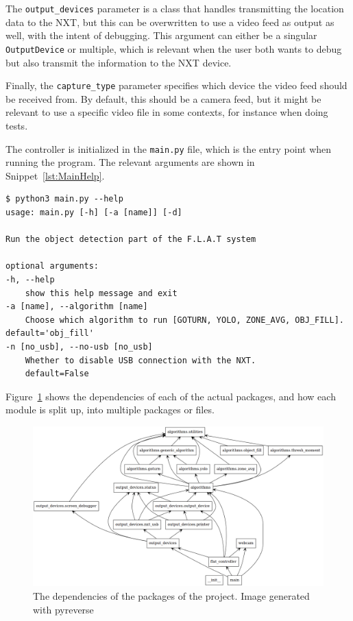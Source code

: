 The \texttt{output\_devices} parameter is a class that handles transmitting the location data to the NXT, but this can be overwritten to use a video feed as output as well, with the intent of debugging. 
This argument can either be a singular \texttt{OutputDevice} or multiple, which is relevant when the user both wants to debug but also transmit the information to the NXT device.


Finally, the \texttt{capture\_type} parameter specifies which device the video feed should be received from.
By default, this should be a camera feed, but it might be relevant to use a specific video file in some contexts, for instance when doing tests.


The controller is initialized in the \texttt{main.py} file, which is the entry point when running the program. 
The relevant arguments are shown in Snippet~\ref{lst:MainHelp}.
\begin{lstlisting}[label={lst:MainHelp},caption={The help message of the commandline interface}]
$ python3 main.py --help
usage: main.py [-h] [-a [name]] [-d]

Run the object detection part of the F.L.A.T system

optional arguments:
-h, --help            
	show this help message and exit
-a [name], --algorithm [name] 
	Choose which algorithm to run [GOTURN, YOLO, ZONE_AVG, OBJ_FILL]. default='obj_fill'
-n [no_usb], --no-usb [no_usb]
	Whether to disable USB connection with the NXT.
	default=False
\end{lstlisting}
Figure~\ref{fig:pythonClasses} shows the dependencies of each of the actual packages, and how each module is split up, into multiple packages or files.

\begin{figure}[H]
	\centering
	\includegraphics[width=\textwidth]{5.Solution/images/python_packages.png}
	\caption{The dependencies of the packages of the project{.} Image generated with pyreverse\cite{pyreverse}}
	\label{fig:pythonClasses}
\end{figure}


